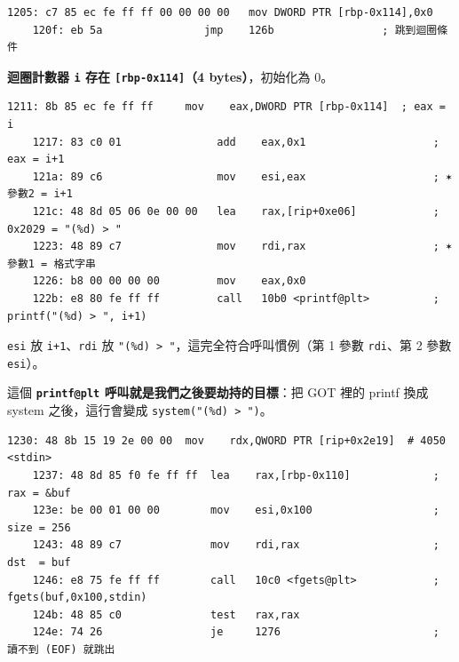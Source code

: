 \documentclass[10pt,a4paper]{article}
\renewenvironment{quote}{%
  \begin{mdframed}[linewidth=0pt,innerleftmargin=0pt,innerrightmargin=0pt,
    innerbottommargin=0pt,innertopmargin=0pt,skipabove=0.55em,skipbelow=0.55em,
    leftmargin=0.9em,rightmargin=0.4em,startcode={\color{quotebar}\vrule width 2.6pt},%
    endcode={}]%
  \itshape\color{black}%
}{%
  \end{mdframed}%
}
\begin{document}
\begin{Verbatim}[breaklines=true,breakanywhere=true,breakautoindent=false,fontsize=\fontsize{7.0}{9.5}\selectfont]
    1205: c7 85 ec fe ff ff 00 00 00 00   mov DWORD PTR [rbp-0x114],0x0
    120f: eb 5a                jmp    126b                 ; 跳到迴圈條件
\end{Verbatim}

\textbf{迴圈計數器 \texttt{i} 存在 \texttt{{[}rbp-\allowbreak{}0x114{]}}（4
bytes）}，初始化為 0。

\begin{Verbatim}[breaklines=true,breakanywhere=true,breakautoindent=false,fontsize=\fontsize{7.0}{9.5}\selectfont]
    1211: 8b 85 ec fe ff ff     mov    eax,DWORD PTR [rbp-0x114]  ; eax = i
    1217: 83 c0 01               add    eax,0x1                    ; eax = i+1
    121a: 89 c6                  mov    esi,eax                    ; ✶ 參數2 = i+1
    121c: 48 8d 05 06 0e 00 00   lea    rax,[rip+0xe06]            ; 0x2029 = "(%d) > "
    1223: 48 89 c7               mov    rdi,rax                    ; ✶ 參數1 = 格式字串
    1226: b8 00 00 00 00         mov    eax,0x0
    122b: e8 80 fe ff ff         call   10b0 <printf@plt>          ; printf("(%d) > ", i+1)
\end{Verbatim}

\texttt{esi} 放 \texttt{i+1}、\texttt{rdi} 放
\texttt{"(\%\allowbreak{}d)\ \allowbreak{}\textgreater{}\allowbreak{}\ \allowbreak{}"}，這完全符合呼叫慣例（第 1 參數
\texttt{rdi}、第 2 參數 \texttt{esi}）。

\begin{quote}
這個 \textbf{\texttt{printf@plt} 呼叫就是我們之後要劫持的目標}：把 GOT
裡的 printf 換成 system 之後，這行會變成
\texttt{system("(\%\allowbreak{}d)\ \allowbreak{}\textgreater{}\allowbreak{}\ \allowbreak{}")}。
\end{quote}

\begin{Verbatim}[breaklines=true,breakanywhere=true,breakautoindent=false,fontsize=\fontsize{7.0}{9.5}\selectfont]
    1230: 48 8b 15 19 2e 00 00  mov    rdx,QWORD PTR [rip+0x2e19]  # 4050 <stdin>
    1237: 48 8d 85 f0 fe ff ff  lea    rax,[rbp-0x110]             ; rax = &buf
    123e: be 00 01 00 00        mov    esi,0x100                   ; size = 256
    1243: 48 89 c7              mov    rdi,rax                     ; dst  = buf
    1246: e8 75 fe ff ff        call   10c0 <fgets@plt>            ; fgets(buf,0x100,stdin)
    124b: 48 85 c0              test   rax,rax
    124e: 74 26                 je     1276                        ; 讀不到 (EOF) 就跳出
\end{Verbatim}
\end{document}

